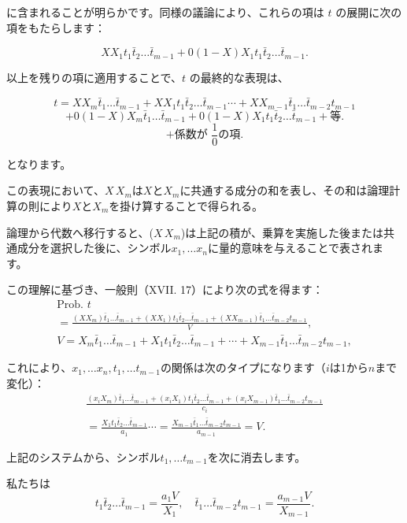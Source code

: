 \documentclass[a4paper,11pt,openany]{ltjsbook}
\begin{document}
に含まれることが明らかです。同様の議論により、これらの項は $t$ の展開に次の項をもたらします：

\[
X X_1 t_1 \bar{t}_2 \dotsc \bar{t}_{m-1}
+ 0(1-X)X_1 t_1 \bar{t}_2 \dotsc \bar{t}_{m-1}.
\]

以上を残りの項に適用することで、$t$ の最終的な表現は、

\[
t = X X_m \bar{t}_1 \dotsc \bar{t}_{m-1}
+ X X_1 t_1 \bar{t}_2 \dotsc \bar{t}_{m-1} \dotsm
+ X X_{m-1} \bar{t}_1 \dotsc \bar{t}_{m-2} t_{m-1}
\]
\[
+ 0(1-X)X_m \bar{t}_1 \dotsc \bar{t}_{m-1}
+ 0(1-X)X_1 t_1 \bar{t}_2 \dotsc \bar{t}_{m-1} + \text{等.}
\]
\[
+ \text{係数が }\frac{1}{0} の項.
\]

となります。

この表現において、$X\,X_m$は$X$と$X_m$に共通する成分の和を表し、その和は論理計算の則により$X$と$X_m$を掛け算することで得られる。

論理から代数へ移行すると、($X\,X_m$)は上記の積が、乗算を実施した後または共通成分を選択した後に、シンボル$x_1, \dotsc x_n$に量的意味を与えることで表されます。

この理解に基づき、一般則（XVII. 17）により次の式を得ます：
\begin{gather*}
  \text{Prob. }t
\\
= \frac{(X X_m) \bar{t}_1 \dotsc \bar{t}_{m-1} + (X X_1)t_1 \bar{t}_2 \dotsc \bar{t}_{m-1} + (X X_{m-1})\bar{t}_1 \dotsc \bar{t}_{m-2} t_{m-1}}{V}, \tag{9}
\\
  V = X_m \bar{t}_1 \dotsc \bar{t}_{m-1} + X_1 t_1 \bar{t}_2 \dotsc \bar{t}_{m-1} + \dotsb + X_{m-1} \bar{t}_1 \dotsc \bar{t}_{m-2} t_{m-1}, \tag{10}
\end{gather*}

これにより、$x_1, \dotsc x_n, t_1, \dotsc t_{m-1}$の関係は次のタイプになります（$i$は1から$n$まで変化）：
\begin{gather*}
  \frac{(x_i X_m) \bar{t}_1 \dotsc \bar{t}_{m-1} + (x_i X_1)t_1 \bar{t}_2 \dotsc \bar{t}_{m-1} + (x_i X_{m-1})\bar{t}_1 \dotsc \bar{t}_{m-2} t_{m-1}}{c_i}
\\
= \frac{X_1 t_1 \bar{t}_2 \dotsc \bar{t}_{m-1}}{a_1} \dotsb = \frac{X_{m-1} \bar{t}_1 \dotsc \bar{t}_{m-2} t_{m-1}}{a_{m-1}} = V. \tag{11}
\end{gather*}

上記のシステムから、シンボル$t_1, \dotsc t_{m-1}$を次に消去します。

私たちは
\[
  t_1 \bar{t}_2 \dotsc \bar{t}_{m-1} = \frac{a_1 V}{X_1}, \quad \bar{t}_1 \dotsc \bar{t}_{m-2} t_{m-1} = \frac{a_{m-1} V}{X_{m-1}}. \tag{12}
\]
\end{document}

